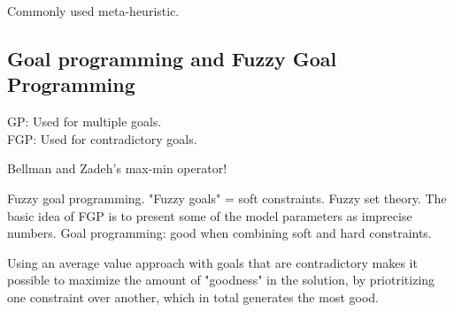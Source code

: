 Commonly used meta-heuristic.

\subsection{Goal programming and Fuzzy Goal Programming}

GP: Used for multiple goals. \\
FGP: Used for contradictory goals.

Bellman and Zadeh's max-min operator!

Fuzzy goal programming.  "Fuzzy goals" = soft constraints. Fuzzy set theory. The basic idea of FGP is to present some of the model parameters as imprecise numbers.
Goal programming: good when combining soft and hard constraints.

Using an average value approach with goals that are contradictory makes it possible to maximize the amount of "goodness" in the solution, by priotritizing one constraint over another, which in total generates the most good.


\fi